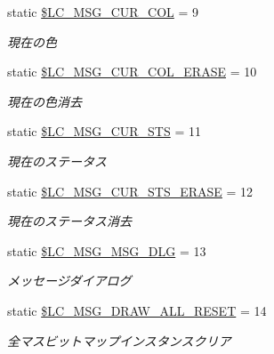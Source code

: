 \begin{DoxyCompactItemize}
static \hyperlink{class_reversi_const_a6acbb83271876a127eadc9eb7cb425cd}{\$\+L\+C\+\_\+\+M\+S\+G\+\_\+\+C\+U\+R\+\_\+\+C\+OL} = 9
\begin{DoxyCompactList}\small\item\em 現在の色 \end{DoxyCompactList}\item 
\mbox{\label{class_reversi_const_aca271c05f15761f26583cfb884e5fc20}} 
static \hyperlink{class_reversi_const_aca271c05f15761f26583cfb884e5fc20}{\$\+L\+C\+\_\+\+M\+S\+G\+\_\+\+C\+U\+R\+\_\+\+C\+O\+L\+\_\+\+E\+R\+A\+SE} = 10
\begin{DoxyCompactList}\small\item\em 現在の色消去 \end{DoxyCompactList}\item 
\mbox{\label{class_reversi_const_ac3301c4726ee8acb3d5f2810d9e0559e}} 
static \hyperlink{class_reversi_const_ac3301c4726ee8acb3d5f2810d9e0559e}{\$\+L\+C\+\_\+\+M\+S\+G\+\_\+\+C\+U\+R\+\_\+\+S\+TS} = 11
\begin{DoxyCompactList}\small\item\em 現在のステータス \end{DoxyCompactList}\item 
\mbox{\label{class_reversi_const_a820a0338238bbd1f21c29b63aadbf2c8}} 
static \hyperlink{class_reversi_const_a820a0338238bbd1f21c29b63aadbf2c8}{\$\+L\+C\+\_\+\+M\+S\+G\+\_\+\+C\+U\+R\+\_\+\+S\+T\+S\+\_\+\+E\+R\+A\+SE} = 12
\begin{DoxyCompactList}\small\item\em 現在のステータス消去 \end{DoxyCompactList}\item 
\mbox{\label{class_reversi_const_a11bb64ddfba78520e7864e0fe8aa89d1}} 
static \hyperlink{class_reversi_const_a11bb64ddfba78520e7864e0fe8aa89d1}{\$\+L\+C\+\_\+\+M\+S\+G\+\_\+\+M\+S\+G\+\_\+\+D\+LG} = 13
\begin{DoxyCompactList}\small\item\em メッセージダイアログ \end{DoxyCompactList}\item 
\mbox{\label{class_reversi_const_ab474e9969881fca250d354949405d7d8}} 
static \hyperlink{class_reversi_const_ab474e9969881fca250d354949405d7d8}{\$\+L\+C\+\_\+\+M\+S\+G\+\_\+\+D\+R\+A\+W\+\_\+\+A\+L\+L\+\_\+\+R\+E\+S\+ET} = 14
\begin{DoxyCompactList}\small\item\em 全マスビットマップインスタンスクリア \end{DoxyCompactList}\end{DoxyCompactItemize}


